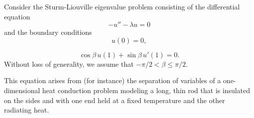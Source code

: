 \begin{Example}
\label{ex:sturm-liouville-robin-example}
Consider the Sturm-Liouville eigenvalue problem consisting of the differential equation
\begin{equation}\label{eq:sturm-liouville-robin-example-ode}
-u''-\lambda u=0
\end{equation}
and the boundary conditions
\begin{equation}\label{eq:sturm-liouville-robin-example-left-condition}
u(0)=0,
\end{equation}

\begin{equation}\label{eq:sturm-liouville-robin-example-right-condition}
\cos\beta\,u(1)+\sin\beta\,u'(1)=0.
\end{equation}
Without loss of generality, we assume that $-\pi/2<\beta\leq\pi/2$.

This equation arises from (for instance) the separation of variables of a one-dimensional heat conduction problem modeling a long, thin rod that is insulated on the sides and with one end held at a fixed temperature and the other radiating heat.


\end{Example}
